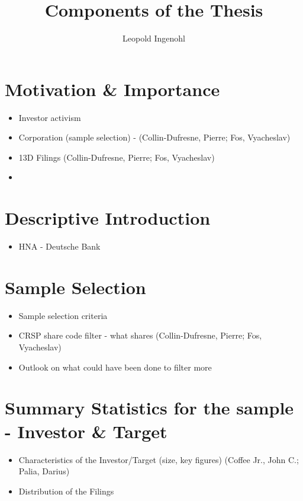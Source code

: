 \documentclass[12pt]{article}
\title{Components of the Thesis}
\author{Leopold Ingenohl}
\begin{document}
\maketitle


\section{Motivation \& Importance} 

    \begin{itemize}
        \item Investor activism 
        \item Corporation (sample selection) - (Collin-Dufresne, Pierre; Fos, Vyacheslav)
        \item 13D Filings (Collin-Dufresne, Pierre; Fos, Vyacheslav)
        \item 
    \end{itemize}

\section{Descriptive Introduction}

    \begin{itemize}
        \item HNA - Deutsche Bank
    \end{itemize}

\section{Sample Selection}

    \begin{itemize}
        \item Sample selection criteria
        \item CRSP share code filter - what shares (Collin-Dufresne, Pierre; Fos, Vyacheslav)
        \item Outlook on what could have been done to filter more 
    \end{itemize}

\section{Summary Statistics for the sample - Investor \& Target}

\begin{itemize}
    \item Characteristics of the Investor/Target (size, key figures) (Coffee Jr., John C.; Palia, Darius)
    \item Distribution of the Filings
\end{itemize}
\end{document}
